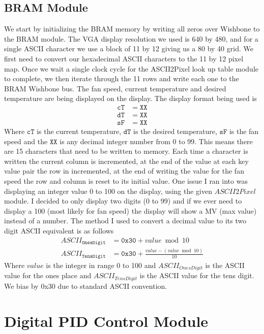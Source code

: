 \documentclass{article}
\begin{document}
\subsection{BRAM Module}
We start by initializing the BRAM memory by writing all zeros over Wishbone to the BRAM module. The VGA display resolution we used is 640 by 480, and for a single ASCII character we use a block of 11 by 12 giving us a 80 by 40 grid. We first need to convert our hexadecimal ASCII characters to the 11 by 12 pixel map. Once we wait a single clock cycle for the ASCII2Pixel look up table module to complete, we then iterate through the 11 rows and write each one to the BRAM Wishbone bus. The fan speed, current temperature and desired temperature are being displayed on the display. The display format being used is
\begin{align*}
\mathtt{cT}&=\mathtt{XX}\\
\mathtt{dT}&=\mathtt{XX}\\
\mathtt{sF}&=\mathtt{XX}
\end{align*}
Where $\mathtt{cT}$ is the current temperature, $\mathtt{dT}$ is the desired temperature, $\mathtt{sF}$ is the fan speed and the $\mathtt{XX}$ is any decimal integer number from 0 to 99. This means there are 15 characters that need to be written to memory. Each time a character is written the current column is incremented, at the end of the value at each key value pair the row in incremented, at the end of writing the value for the fan speed the row and column is reset to its initial value. One issue I ran into was displaying an integer value 0 to 100 on the display, using the given $ASCII2Pixel$ module. I decided to only display two digits (0 to 99) and if we ever need to display a 100 (most likely for fan speed) the display will show a MV (max value) instead of a number. The method I used to convert a decimal value to its two digit ASCII equivalent is as follows
\begin{align*}
ASCII_{\mathtt{OnesDigit}} &=\mathtt{0x30} + value \bmod 10\\
ASCII_{\mathtt{TensDigit}} &=\mathtt{0x30} + \frac{value-(value\bmod{10})}{10}
\end{align*}
Where $value$ is the integer in range 0 to 100 and $ASCII_{OnesDigit}$ is the ASCII value for the ones place and $ASCII_{TensDigit}$ is the ASCII value for the tens digit. We bias by 0x30 due to standard ASCII convention.
\newpage
\section{Digital PID Control Module}
\end{document}
